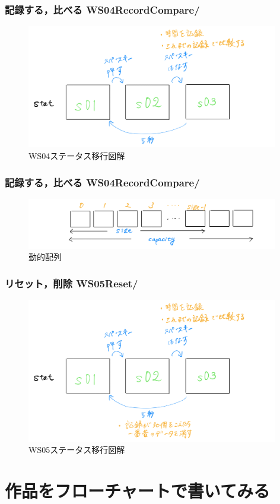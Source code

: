 \documentclass[10pt, dvipdfmx]{beamer}
\begin{document}
        \begin{frame}
            \frametitle{記録する，比べる WS04RecordCompare/}
            \begin{figure}[htb]
                 \includegraphics[width=110mm]{images/ws04-1.png}
                 \caption{WS04ステータス移行図解}
                \label{fig:15}
            \end{figure}
        \end{frame}

        \begin{frame}
            \frametitle{記録する，比べる WS04RecordCompare/}
            \begin{figure}[htb]
                 \includegraphics[width=110mm]{images/ws04-2.png}
                 \caption{動的配列}
                \label{fig:16}
            \end{figure}
        \end{frame}

        \begin{frame}
            \frametitle{リセット，削除 WS05Reset/}
            \begin{figure}[htb]
                 \includegraphics[width=110mm]{images/ws05-1.png}
                 \caption{WS05ステータス移行図解}
                \label{fig:17}
            \end{figure}
        \end{frame}

    \section{作品をフローチャートで書いてみる}
        \begin{frame}
        \end{frame}

        \begin{frame}
        \end{frame}
\end{document}
